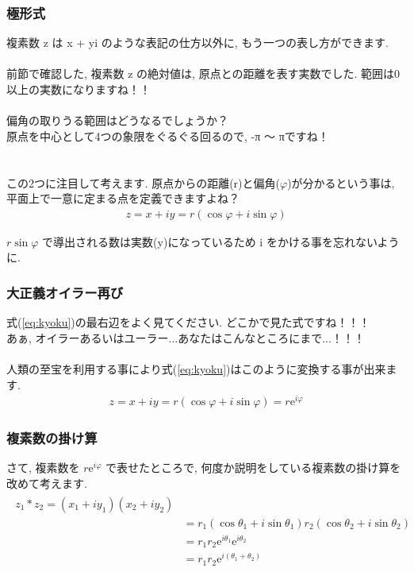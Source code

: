 \documentclass[11pt,a4paper]{jsarticle}
\begin{document}
\subsubsection{極形式}
複素数 z は x + yi のような表記の仕方以外に, もう一つの表し方ができます.\\
\\
前節で確認した, 複素数 z の絶対値は, 原点との距離を表す実数でした. 範囲は0以上の実数になりますね！！\\
\\
偏角の取りうる範囲はどうなるでしょうか？\\
原点を中心として4つの象限をぐるぐる回るので, -π ～ πですね！\\
\\
\\
この2つに注目して考えます. 原点からの距離(r)と偏角($\varphi$)が分かるという事は, 平面上で一意に定まる点を定義できますよね？
\begin{eqnarray}
z = x + iy = r(\cos \varphi + i\sin \varphi)
\label{eq:kyoku}
\end{eqnarray}

$r\sin\varphi$ で導出される数は実数(y)になっているため i をかける事を忘れないように.\\

\subsubsection{大正義オイラー再び}
式(\ref{eq:kyoku})の最右辺をよく見てください. どこかで見た式ですね！！！\\
あぁ, オイラーあるいはユーラー...あなたはこんなところにまで...！！！\\
\\
人類の至宝を利用する事により式(\ref{eq:kyoku})はこのように変換する事が出来ます.\\
\begin{eqnarray}
z = x + iy = r(\cos\varphi + i\sin \varphi) = r \mathrm{e}^{i\varphi}
\end{eqnarray}

\subsubsection{複素数の掛け算}
さて, 複素数を $r\mathrm{e}^{i\varphi}$ で表せたところで, 何度か説明をしている複素数の掛け算を改めて考えます.\\
\begin{eqnarray}
\begin{split}
z_1 * z_2 = (x_1 + iy_1)(x_2 + iy_2)\\
&= r_1(\cos\theta_1 + i\sin\theta_1)r_2(\cos\theta_2 + i\sin\theta_2)\\
&= r_1r_2\mathrm{e}^{i\theta_1} \mathrm{e}^{i\theta_2}\\
&= r_1r_2\mathrm{e}^{i(\theta_1 + \theta_2)}
\end{split}
\end{eqnarray}
\end{document}
